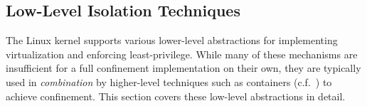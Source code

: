 %
%

\subsection{Low-Level Isolation Techniques}
\label{subsection:low_level}

The Linux kernel supports various lower-level abstractions for implementing virtualization and enforcing least-privilege. While many of these mechanisms are insufficient for a full confinement implementation on their own, they are typically used in \textit{combination} by higher-level techniques such as containers (c.f.~) to achieve confinement. This section covers these low-level abstractions in detail.


